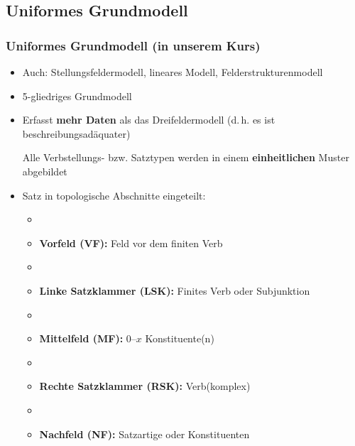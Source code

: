 \subsection{Uniformes Grundmodell}


\begin{frame}
\frametitle{Uniformes Grundmodell (in unserem Kurs)}

\begin{itemize}
	\item Auch: Stellungsfeldermodell,  lineares Modell, Felderstrukturenmodell 
	\item 5-gliedriges Grundmodell
	\item Erfasst \textbf{mehr Daten} als das Dreifeldermodell (d.\,h. es ist beschreibungsadäquater) 
	
	\ras Alle Verbstellungs- bzw. Satztypen werden in einem \textbf{einheitlichen} Muster abgebildet
\end{itemize}

\end{frame}

\begin{frame}

\begin{itemize}
	\item Satz in topologische Abschnitte eingeteilt:
	\begin{itemize}
		\item []
		\item \textbf{Vorfeld (VF):} Feld vor dem finiten Verb
		\item[]
		\item \textbf{Linke Satzklammer (LSK):} Finites Verb oder Subjunktion
		\item[]
		\item \textbf{Mittelfeld (MF):} 0--$x$ Konstituente(n)
		\item[]		
		\item \textbf{Rechte Satzklammer (RSK):} Verb(komplex)
		\item[]		
		\item \textbf{Nachfeld (NF):} Satzartige oder  Konstituenten
	\end{itemize}
\pause
\end{itemize}

\begin{table}
\centering
{}
\end{table}
	
 \end{frame}


